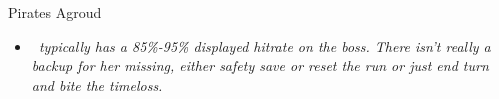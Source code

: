 \begin{battle}{Pirates Agroud}
\begin{enumerate}
\end{enumerate}
\vspace{3mm}
\begin{itemize}
    \item \textit{\titania\ typically has a 85\%-95\% displayed hitrate on the boss. There isn’t really a backup for her missing, either safety save or reset the run or just end turn and bite the timeloss.}
\end{itemize}
\end{battle}